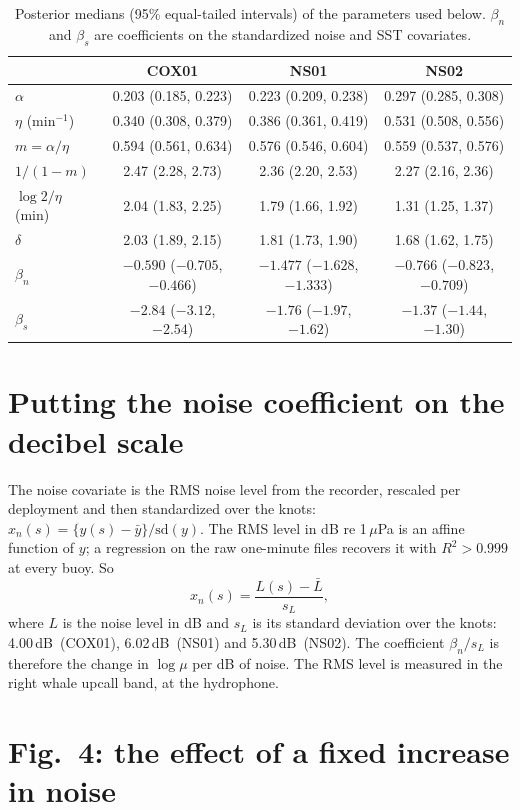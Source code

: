 \documentclass[11pt]{article}
\newcommand{\dB}{\,\textrm{dB}}
\begin{document}
\begin{table}[H]
\centering\small
\caption{Posterior medians (95\% equal-tailed intervals) of the parameters
used below. $\beta_n$ and $\beta_s$ are coefficients on the standardized
noise and SST covariates.}
\label{tab:params}
\begin{tabular}{lccc}
\toprule
& COX01 & NS01 & NS02 \\
\midrule
$\alpha$ & 0.203 (0.185, 0.223) & 0.223 (0.209, 0.238) & 0.297 (0.285, 0.308)\\
$\eta$ (min$^{-1}$) & 0.340 (0.308, 0.379) & 0.386 (0.361, 0.419) & 0.531 (0.508, 0.556)\\
$m=\alpha/\eta$ & 0.594 (0.561, 0.634) & 0.576 (0.546, 0.604) & 0.559 (0.537, 0.576)\\
$1/(1-m)$ & 2.47 (2.28, 2.73) & 2.36 (2.20, 2.53) & 2.27 (2.16, 2.36)\\
$\log2/\eta$ (min) & 2.04 (1.83, 2.25) & 1.79 (1.66, 1.92) & 1.31 (1.25, 1.37)\\
$\delta$ & 2.03 (1.89, 2.15) & 1.81 (1.73, 1.90) & 1.68 (1.62, 1.75)\\
$\beta_n$ & $-0.590$ ($-0.705$, $-0.466$) & $-1.477$ ($-1.628$, $-1.333$) & $-0.766$ ($-0.823$, $-0.709$)\\
$\beta_s$ & $-2.84$ ($-3.12$, $-2.54$) & $-1.76$ ($-1.97$, $-1.62$) & $-1.37$ ($-1.44$, $-1.30$)\\
\bottomrule
\end{tabular}
\end{table}

\section{Putting the noise coefficient on the decibel scale}\label{sec:db}

The noise covariate is the RMS noise level from the recorder, rescaled per
deployment and then standardized over the knots:
$x_n(s)=\{y(s)-\bar y\}/\mathrm{sd}(y)$. The RMS level in
dB re 1\,$\mu$Pa is an affine function of $y$; a regression on the raw
one-minute files recovers it with $R^2>0.999$ at every buoy. So
\[
x_n(s)=\frac{L(s)-\bar L}{s_L},
\]
where $L$ is the noise level in dB and $s_L$ is its standard deviation over
the knots: 4.00\dB\ (COX01), 6.02\dB\ (NS01) and 5.30\dB\ (NS02). The
coefficient $\beta_n/s_L$ is therefore the change in $\log\mu$ per dB of
noise. The RMS level is measured in the right whale upcall band, at the
hydrophone.

\section{Fig.~4: the effect of a fixed increase in noise}\label{sec:fig4}
\end{document}

